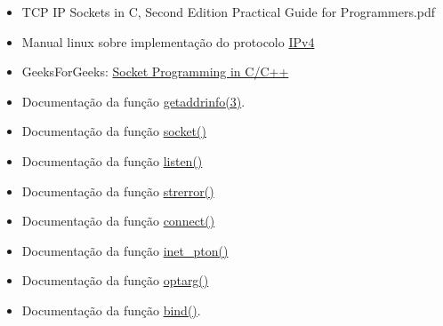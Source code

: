 \documentclass[12pt]{article}
\begin{document}
\begin{itemize}
    \item TCP IP Sockets in C, Second Edition Practical Guide for Programmers.pdf
    \item Manual linux sobre implementação do protocolo \href{https://man7.org/linux/man-pages/man7/ip.7.html}{IPv4}
    \item GeeksForGeeks: \href{https://www.geeksforgeeks.org/socket-programming-cc/}{Socket Programming in C/C++}
    \item Documentação da função \href{https://man7.org/linux/man-pages/man3/getaddrinfo.3.html}{getaddrinfo(3)}.
    \item Documentação da função \href{https://linux.die.net/man/7/socket}{socket()}
    \item Documentação da função \href{https://linux.die.net/man/2/listen}{listen()}
    \item Documentação da função \href{https://man7.org/linux/man-pages/man3/strerror.3.html}{strerror()}
    \item Documentação da função \href{https://man7.org/linux/man-pages/man2/connect.2.html}{connect()}
    \item Documentação da função \href{https://man7.org/linux/man-pages/man3/inet_pton.3.html}{inet\_pton()}
    \item Documentação da função \href{https://linux.die.net/man/3/optarg}{optarg()}
    \item Documentação da função \href{https://man7.org/linux/man-pages/man2/bind.2.html}{bind()}.
\end{itemize}
\end{document}
